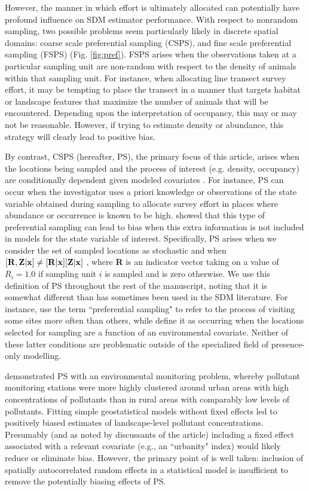 \documentclass[times,mee,doublespace,]{besauth2}
\begin{document}
However, the manner in which effort is ultimately allocated can potentially have profound influence on SDM estimator performance.  With respect to nonrandom sampling, two possible problems seem particularly likely in discrete spatial domains: coarse scale preferential sampling (CSPS), and fine scale preferential sampling (FSPS) (Fig. \ref{fig:pref}).  FSPS arises when the observations taken at a  particular sampling unit are non-random with respect to the density of animals within that sampling unit.  For instance, when allocating line transect survey effort, it may be tempting to place the transect in a manner that targets habitat or landscape features that maximize the number of animals that will be encountered.  Depending upon the interpretation of occupancy, this may or may not be reasonable.  However, if trying to estimate density or abundance, this strategy will clearly lead to positive bias.

By contrast, CSPS (hereafter, PS), the primary focus of this article, arises when the locations being sampled and the process of interest (e.g. density, occupancy) are conditionally dependent given modeled covariates \citep{DiggleEtAl2010}.  For instance, PS can occur when the investigator uses a priori knowledge or observations of the state variable obtained during sampling to allocate survey effort in places where abundance or occurrence is known to be high. \citet{DiggleEtAl2010} showed that this type of preferential sampling can lead to bias when this extra information is not included in models for the state variable of interest.  Specifically, PS arises when we consider the set of sampled locations as stochastic and when $[{\bf R},{\bf Z} | {\bf x}] \neq [{\bf R}|{\bf x}][{\bf Z}|{\bf x}]$ \citep{DiggleEtAl2010}, where \textbf{R} is an indicator vector taking on a value of $R_i = 1.0$ if sampling unit $i$ is sampled and is zero otherwise.  We use this definition of PS throughout the rest of the manuscript, noting that it is somewhat different than has sometimes been used in the SDM literature.  For instance, \citet{MerckxEtAl2011} use the term ``preferential sampling" to refer to the process of visiting some sites more often than others, while \citet{ManceurKuhn2014} define it as occurring when the locations selected for sampling are a function of an environmental covariate.  Neither of these latter conditions are problematic outside of the specialized field of presence-only modelling.

\citet{DiggleEtAl2010} demonstrated PS with an environmental monitoring problem, whereby pollutant monitoring stations were more highly clustered around urban areas with high concentrations of pollutants than in rural areas with comparably low levels of pollutants.  Fitting simple geostatistical models without fixed effects led to positively biased estimates of landscape-level pollutant concentrations.  Presumably (and as noted by discussants of the article) including a fixed effect associated with a relevant covariate (e.g., an ``urbanity" index) would likely reduce or eliminate bias.  However, the primary point of \citet{DiggleEtAl2010} is well taken: inclusion of spatially autocorrelated random effects in a statistical model is insufficient to remove the potentially biasing effects of PS.
\end{document}
